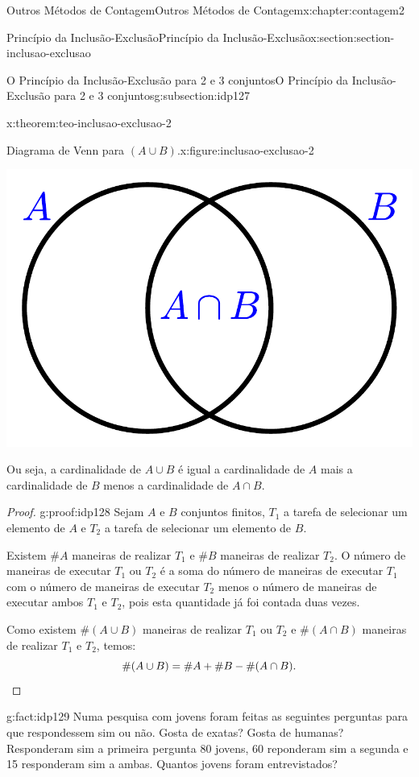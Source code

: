 \documentclass[oneside,10pt,]{book}
\newcommand{\qedhere}{\relax}
\numberwithin{equation}{section}
\begin{document}
\begin{chapterptx}{Outros Métodos de Contagem}{}{Outros Métodos de Contagem}{}{}{x:chapter:contagem2}
\begin{sectionptx}{Princípio da Inclusão-Exclusão}{}{Princípio da Inclusão-Exclusão}{}{}{x:section:section-inclusao-exclusao}
\begin{subsectionptx}{O Princípio da Inclusão-Exclusão para 2 e 3 conjuntos}{}{O Princípio da Inclusão-Exclusão para 2 e 3 conjuntos}{}{}{g:subsection:idp127}
\begin{theorem}{}{}{x:theorem:teo-inclusao-exclusao-2}
\begin{figureptx}{Diagrama de Venn para \((A\cup B)\).}{x:figure:inclusao-exclusao-2}{}
\begin{image}{0.35}{0.3}{0.35}
\includegraphics[width=\linewidth]{images/inclusaoexclusao2}
\end{image}%
\tcblower
\end{figureptx}%
Ou seja, a cardinalidade de \(A\cup B\) é igual a cardinalidade de \(A\) mais a cardinalidade de \(B\) menos a cardinalidade de \(A\cap B\).%
\end{theorem}
\begin{proof}{}{g:proof:idp128}
Sejam \(A\) e \(B\) conjuntos finitos, \(T_1\) a tarefa de selecionar um elemento de \(A\) e \(T_2\) a tarefa de selecionar um elemento de \(B\).%
\par
Existem \(\#A\) maneiras de realizar \(T_1\) e \(\#B\) maneiras de realizar \(T_2\). O número de maneiras de executar \(T_1\) ou \(T_2\) é a soma do número de maneiras de executar \(T_1\) com o número de maneiras de executar \(T_2\) menos o número  de maneiras de  executar ambos \(T_1\) e \(T_2\), pois esta quantidade já foi contada duas vezes.%
\par
Como existem \(\#(A\cup B)\) maneiras de realizar \(T_1\) ou \(T_2\) e \(\#(A\cap B)\) maneiras de realizar \(T_1\) e \(T_2\), temos:%
\begin{equation*}
\#(A\cup B)=\#A+\#B-\#(A\cap B).\qedhere
\end{equation*}
%
\end{proof}
\begin{fact}{}{}{g:fact:idp129}%
Numa pesquisa com jovens foram feitas as seguintes perguntas para que respondessem sim ou não. Gosta de exatas? Gosta de humanas? Responderam sim a primeira pergunta 80 jovens, 60 reponderam sim a segunda e 15 responderam sim a ambas. Quantos jovens foram entrevistados?%

\end{fact}
\end{subsectionptx}
\end{sectionptx}
\end{chapterptx}
\end{document}
